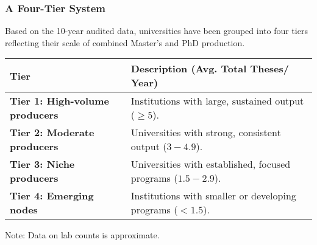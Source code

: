 \documentclass[aspectratio=169]{beamer}
\begin{document}
\begin{frame}
    \frametitle{A Four-Tier System}
    Based on the 10-year audited data, universities have been grouped into four tiers reflecting their scale of combined Master's and PhD production.
    
    \begin{center}
    \begin{tabularx}{0.9\textwidth}{l >{\RaggedRight}X}
        \toprule
        \textbf{Tier} & \textbf{Description (Avg. Total Theses/ Year)} \\
        \midrule
        \textbf{Tier 1: High-volume producers} & Institutions with large, sustained output ($\geq 5$). \\
        \addlinespace
        \textbf{Tier 2: Moderate producers} & Universities with strong, consistent output ($3 - 4.9$). \\
        \addlinespace
        \textbf{Tier 3: Niche producers} & Universities with established, focused programs \break ($1.5 - 2.9$). \\
        \addlinespace
        \textbf{Tier 4: Emerging nodes} & Institutions with smaller or developing programs \break ($< 1.5$). \\
        \bottomrule
    \end{tabularx}
    \end{center}
    Note: Data on lab counts is approximate.
\end{frame}
\end{document}
